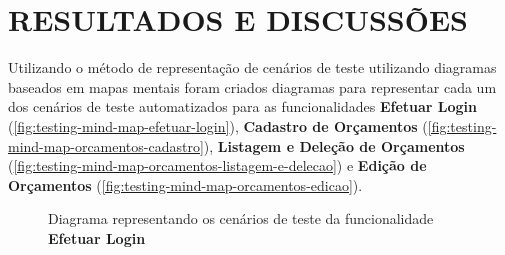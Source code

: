 
\chapter{RESULTADOS E DISCUSSÕES}
\label{chap:resultados}

Utilizando o método de representação de cenários de teste utilizando diagramas baseados em mapas mentais foram criados diagramas para representar cada um dos cenários de teste automatizados para as funcionalidades \textbf{Efetuar Login} (\autoref{fig:testing-mind-map-efetuar-login}), \textbf{Cadastro de Orçamentos} (\autoref{fig:testing-mind-map-orcamentos-cadastro}), \textbf{Listagem e Deleção de Orçamentos} (\autoref{fig:testing-mind-map-orcamentos-listagem-e-delecao}) e \textbf{Edição de Orçamentos} (\autoref{fig:testing-mind-map-orcamentos-edicao}).

            \begin{figure}[!htb]
                \centering
	            \begin{minipage}{\wd0}
		            \caption{Diagrama representando os cenários de teste da funcionalidade \textbf{Efetuar Login}} %
		            \label{fig:testing-mind-map-efetuar-login}
	            \end{minipage}
            \end{figure}

